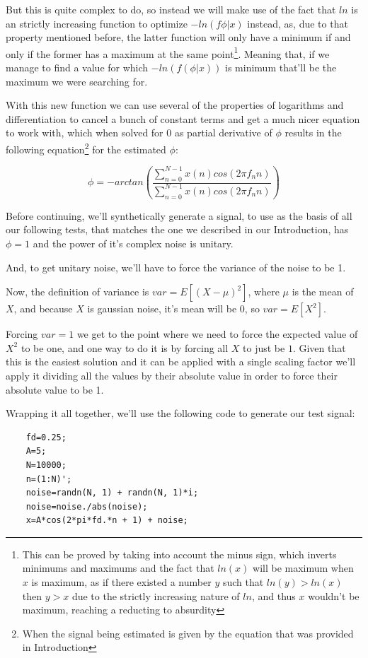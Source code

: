 \documentclass[conference,9pt]{IEEEtran}
\begin{document}
But this is quite complex to do, so instead we will make use of the fact that $ln$ is an strictly increasing function to optimize $-ln(f\phi|x)$ instead, as, due to that property mentioned before, the latter function will only have a minimum if and only if the former has a maximum at the same point\footnote{This can be proved by taking into account the minus sign, which inverts minimums and maximums and the fact that $ln(x)$ will be maximum when $x$ is maximum, as if there existed a number $y$ such that $ln(y)>ln(x)$ then $y>x$ due to the strictly increasing nature of $ln$, and thus $x$ wouldn't be maximum, reaching a reducting to absurdity}. Meaning that, if we manage to find a value for which $-ln(f(\phi|x))$ is minimum that'll be the maximum we were searching for.

With this new function we can use several of the properties of logarithms and differentiation to cancel a bunch of constant terms and get a much nicer equation to work with, which when solved for 0 as partial derivative of $\phi$ results in the following equation\footnote{When the signal being estimated is given by the equation that was provided in Introduction} for the estimated $\phi$:

$$\phi=-arctan(\frac{\sum_{n=0}^{N-1}x(n)cos(2\pi f_n n)}{\sum_{n=0}^{N-1}x(n)cos(2\pi f_n n)})$$

Before continuing, we'll synthetically generate a signal, to use as the basis of all our following tests, that matches the one we described in our Introduction, has $\phi=1$ and the power of it's complex noise is unitary. 

And, to get unitary noise, we'll have to force the variance of the noise to be 1.

Now, the definition of variance is $var=E[(X-\mu)^2]$, where $\mu$ is the mean of $X$, and because $X$ is gaussian noise, it's mean will be 0, so $var=E[X^2]$.

Forcing $var=1$ we get to the point where we need to force the expected value of $X^2$ to be one, and one way to do it is by forcing all $X$ to just be $1$. Given that this is the easiest solution and it can be applied with a single scaling factor we'll apply it dividing all the values by their absolute value in order to force their absolute value to be 1.

Wrapping it all together, we'll use the following code to generate our test signal:
\begin{verbatim}
    fd=0.25;
    A=5;
    N=10000;
    n=(1:N)';
    noise=randn(N, 1) + randn(N, 1)*i;
    noise=noise./abs(noise);
    x=A*cos(2*pi*fd.*n + 1) + noise;
\end{verbatim}
\end{document}
